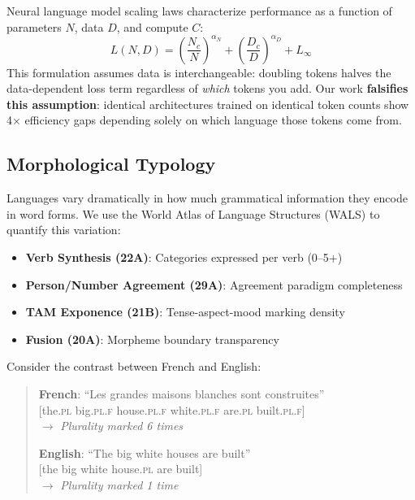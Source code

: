\documentclass[11pt]{article}
\begin{document}
Neural language model scaling laws \citep{kaplan2020scaling, hoffmann2022training} characterize performance as a function of parameters $N$, data $D$, and compute $C$:
\[
L(N, D) = \left(\frac{N_c}{N}\right)^{\alpha_N} + \left(\frac{D_c}{D}\right)^{\alpha_D} + L_\infty
\]
This formulation assumes data is interchangeable: doubling tokens halves the data-dependent loss term regardless of \textit{which} tokens you add. Our work \textbf{falsifies this assumption}: identical architectures trained on identical token counts show 4× efficiency gaps depending solely on which language those tokens come from.

\subsection{Morphological Typology}

Languages vary dramatically in how much grammatical information they encode in word forms. We use the World Atlas of Language Structures (WALS) \citep{dryer2013wals} to quantify this variation:

\begin{itemize}
    \item \textbf{Verb Synthesis (22A)}: Categories expressed per verb (0--5+)
    \item \textbf{Person/Number Agreement (29A)}: Agreement paradigm completeness
    \item \textbf{TAM Exponence (21B)}: Tense-aspect-mood marking density
    \item \textbf{Fusion (20A)}: Morpheme boundary transparency
\end{itemize}

Consider the contrast between French and English:

\begin{quote}
\textbf{French}: ``Les grandes maisons blanches sont construites''\\
\hspace*{1cm}[the.\textsc{pl} big.\textsc{pl.f} house.\textsc{pl.f} white.\textsc{pl.f} are.\textsc{pl} built.\textsc{pl.f}]\\
\hspace*{1cm}$\rightarrow$ \textit{Plurality marked 6 times}

\textbf{English}: ``The big white houses are built''\\
\hspace*{1cm}[the big white house.\textsc{pl} are built]\\
\hspace*{1cm}$\rightarrow$ \textit{Plurality marked 1 time}
\end{quote}
\end{document}
